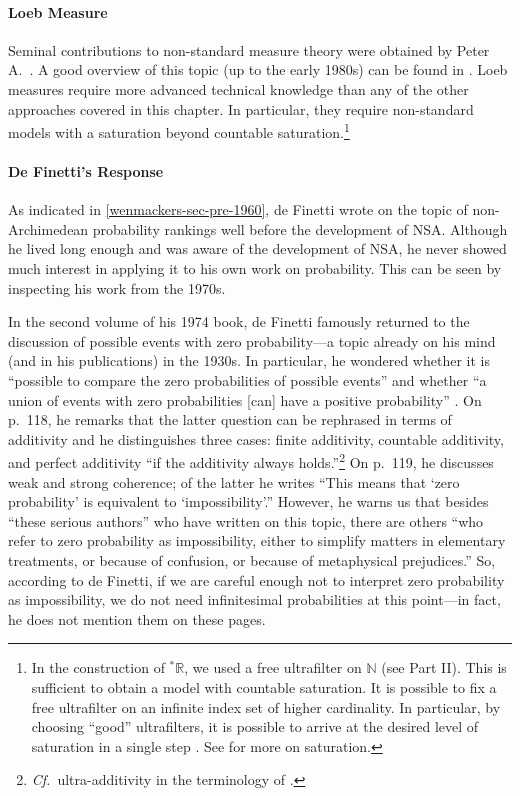\paragraph{Loeb Measure}
Seminal contributions to non-standard measure theory were obtained by Peter A.~\citet{Loeb:1975}. A good overview of this topic (up to the early 1980s) can be found in \citet{Cutland:1983}. Loeb measures require more advanced technical knowledge than any of the other approaches covered in this chapter. In particular, they require non-standard models with a saturation beyond countable saturation.\footnote{In the construction of ${^\ast\mathbb{R}}$, we used a free ultrafilter on $\mathbb{N}$ (see Part II). This is sufficient to obtain a model with countable saturation. It is possible to fix a free ultrafilter on an infinite index set of higher cardinality. In particular, by choosing ``good'' ultrafilters, it is possible to arrive at the desired level of saturation in a single step \citep[section~10]{Keisler:2010}. See \citet[pp.~104--108]{HurdLoeb:1985} for more on saturation.}

\paragraph{De Finetti's Response}\label{sec:dF2}
As indicated in \autoref{wenmackers-sec-pre-1960}, de Finetti wrote on the topic of non-Archimedean probability rankings well before the development of NSA. Although he lived long enough and was aware of the development of NSA, he never showed much interest in applying it to his own work on probability. This can be seen by inspecting his work from the 1970s.

In the second volume of his 1974 book, de Finetti famously returned to the discussion of possible events with zero probability---a topic already on his mind (and in his publications) in the 1930s.
In particular, he wondered whether it is ``possible to compare the zero probabilities of possible events'' and whether ``a union of events with zero probabilities [can] have a positive probability'' \citep[Vol.~II, p.~117]{deFinetti:1974}.
On p.~118, he remarks that the latter question can be rephrased in terms of additivity and he distinguishes three cases: finite additivity, countable additivity, and perfect additivity ``if the additivity always holds.''\footnote{\textit{Cf.}\ ultra-additivity in the terminology of \citet{Skyrms:1983a}.}
On p.~119, he discusses weak and strong coherence; of the latter he writes ``This means that `zero probability' is equivalent to `impossibility'.'' However, he warns us that besides ``these serious authors'' who have written on this topic, there are others ``who refer to zero probability as impossibility, either to simplify matters in elementary treatments, or because of confusion, or because of metaphysical prejudices.''
So, according to de Finetti, if we are careful enough not to interpret zero probability as impossibility, we do not need infinitesimal probabilities at this point---in fact, he does not mention them on these pages.

